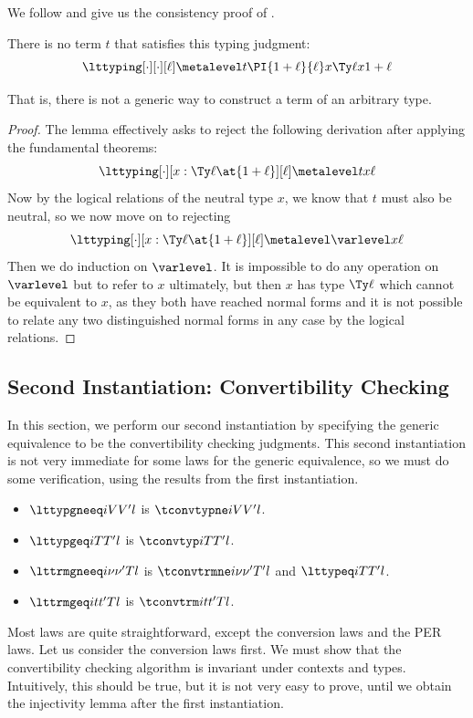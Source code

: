 We follow \citet{hu_jang_pientka_2023} and give us the consistency proof of \delamlang.
\begin{lemma}[Consistency]
  There is no term $t$ that satisfies this typing judgment:
  \[
    \lttyping[\cdot][\cdot][\ell] \metalevel t{\PI{1 + \ell}{\ell}x{\Ty \ell}x}{1 + \ell}
  \]
\end{lemma}
That is, there is not a generic way to construct a term of an arbitrary type.
\begin{proof}
  The lemma effectively asks to reject the following derivation after applying the
  fundamental theorems:
  \[
    \lttyping[\cdot][x : \Ty \ell \at{1 + \ell}][\ell] \metalevel t x \ell
  \]
  Now by the logical relations of the neutral type $x$, we know that $t$ must also be
  neutral, so we now move on to rejecting 
  \[
    \lttyping[\cdot][x : \Ty \ell \at{1 + \ell}][\ell] \metalevel \varlevel x \ell
  \]
  Then we do induction on $\varlevel$. %
  It is impossible to do any operation on $\varlevel$ but to refer to $x$ ultimately, but then
  $x$ has type $\Ty \ell$ which cannot be equivalent to $x$, as they both have reached
  normal forms and it is not possible to relate any two distinguished normal forms in
  any case by the logical relations. %
\end{proof}

\subsection{Second Instantiation: Convertibility Checking}

In this section, we perform our second instantiation by specifying the generic
equivalence to be the convertibility checking judgments. %
This second instantiation is not very immediate for some laws for the generic
equivalence, so we must do some verification, using the results from the first
instantiation. %

\begin{itemize}
\item $\lttypgneeq i V{V'} l$ is $\tconvtypne i V{V'}l$.
\item $\lttypgeq i {T}{T'} l$ is $\tconvtyp i T{T'} l$.
\item $\lttrmgneeq i \nu{\nu'} T l$ is $\tconvtrmne i \nu{\nu'}{T'} l$ and
  $\lttypeq i T{T'} l$.
\item $\lttrmgeq i t{t'} T l$ is $\tconvtrm i t{t'}T l$.
\end{itemize}

Most laws are quite straightforward, except the conversion laws and the PER laws. %
Let us consider the conversion laws first. %
We must show that the convertibility checking algorithm is invariant under contexts
and types. %
Intuitively, this should be true, but it is not very easy to prove, until we obtain
the injectivity lemma after the first instantiation.

